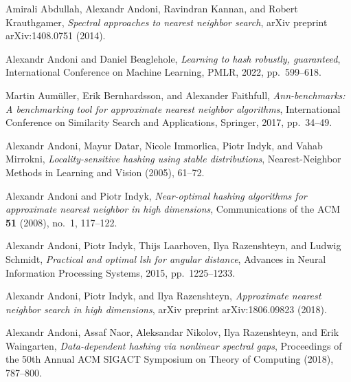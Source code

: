 \documentclass[11pt]{article}
\begin{document}

\begin{thebibliography}{10}
\itemsep=1pt
\begin{small}
\newcommand{\etalchar}[1]{$^{#1}$}
\providecommand{\bysame}{\leavevmode\hbox to3em{\hrulefill}\thinspace}
\providecommand{\MR}{\relax\ifhmode\unskip\space\fi MR }
\providecommand{\MRhref}[2]{%
  \href{http://www.ams.org/mathscinet-getitem?mr=#1}{#2}
}
\providecommand{\href}[2]{#2}


Amirali Abdullah, Alexandr Andoni, Ravindran Kannan, and Robert Krauthgamer, \emph{Spectral approaches to nearest neighbor search}, arXiv preprint arXiv:1408.0751 (2014).

Alexandr Andoni and Daniel Beaglehole, \emph{Learning to hash robustly, guaranteed}, International Conference on Machine Learning, PMLR, 2022, pp.~599--618.

Martin Aum{\"u}ller, Erik Bernhardsson, and Alexander Faithfull, \emph{Ann-benchmarks: A benchmarking tool for approximate nearest neighbor algorithms}, International Conference on Similarity Search and Applications, Springer, 2017, pp.~34--49.

Alexandr Andoni, Mayur Datar, Nicole Immorlica, Piotr Indyk, and Vahab Mirrokni, \emph{Locality-sensitive hashing using stable distributions}, Nearest-Neighbor Methods in Learning and Vision (2005), 61--72.

Alexandr Andoni and Piotr Indyk, \emph{Near-optimal hashing algorithms for approximate nearest neighbor in high dimensions}, Communications of the ACM \textbf{51} (2008), no.~1, 117--122.

Alexandr Andoni, Piotr Indyk, Thijs Laarhoven, Ilya Razenshteyn, and Ludwig Schmidt, \emph{Practical and optimal lsh for angular distance}, Advances in Neural Information Processing Systems, 2015, pp.~1225--1233.

Alexandr Andoni, Piotr Indyk, and Ilya Razenshteyn, \emph{Approximate nearest neighbor search in high dimensions}, arXiv preprint arXiv:1806.09823 (2018).

Alexandr Andoni, Assaf Naor, Aleksandar Nikolov, Ilya Razenshteyn, and Erik Waingarten, \emph{Data-dependent hashing via nonlinear spectral gaps}, Proceedings of the 50th Annual ACM SIGACT Symposium on Theory of Computing (2018), 787--800.


\end{small}
\end{thebibliography}
\end{document}
